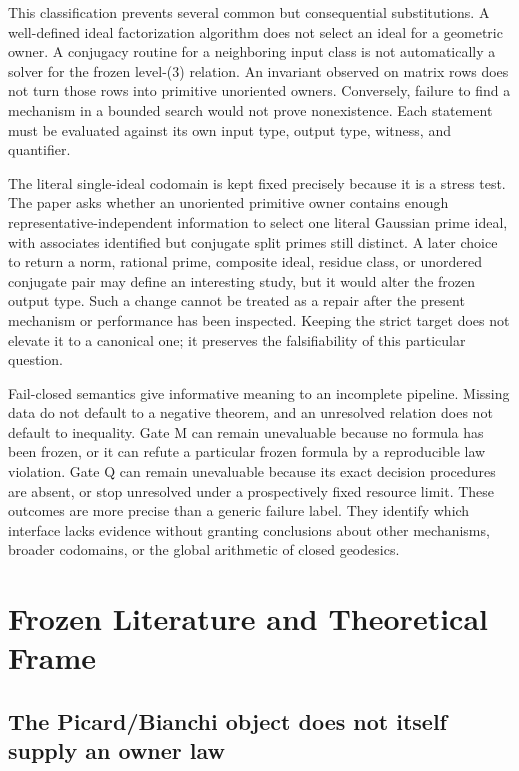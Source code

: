 \documentclass[11pt,a4paper]{article}
\begin{document}
This classification prevents several common but consequential substitutions. A well-defined ideal factorization algorithm does not select an ideal for a geometric owner. A conjugacy routine for a neighboring input class is not automatically a solver for the frozen level-(3) relation. An invariant observed on matrix rows does not turn those rows into primitive unoriented owners. Conversely, failure to find a mechanism in a bounded search would not prove nonexistence. Each statement must be evaluated against its own input type, output type, witness, and quantifier.

The literal single-ideal codomain is kept fixed precisely because it is a stress test. The paper asks whether an unoriented primitive owner contains enough representative-independent information to select one literal Gaussian prime ideal, with associates identified but conjugate split primes still distinct. A later choice to return a norm, rational prime, composite ideal, residue class, or unordered conjugate pair may define an interesting study, but it would alter the frozen output type. Such a change cannot be treated as a repair after the present mechanism or performance has been inspected. Keeping the strict target does not elevate it to a canonical one; it preserves the falsifiability of this particular question.

Fail-closed semantics give informative meaning to an incomplete pipeline. Missing data do not default to a negative theorem, and an unresolved relation does not default to inequality. Gate M can remain unevaluable because no formula has been frozen, or it can refute a particular frozen formula by a reproducible law violation. Gate Q can remain unevaluable because its exact decision procedures are absent, or stop unresolved under a prospectively fixed resource limit. These outcomes are more precise than a generic failure label. They identify which interface lacks evidence without granting conclusions about other mechanisms, broader codomains, or the global arithmetic of closed geodesics.

\section{Frozen Literature and Theoretical Frame}

\subsection{The Picard/Bianchi object does not itself supply an owner law}
\end{document}
